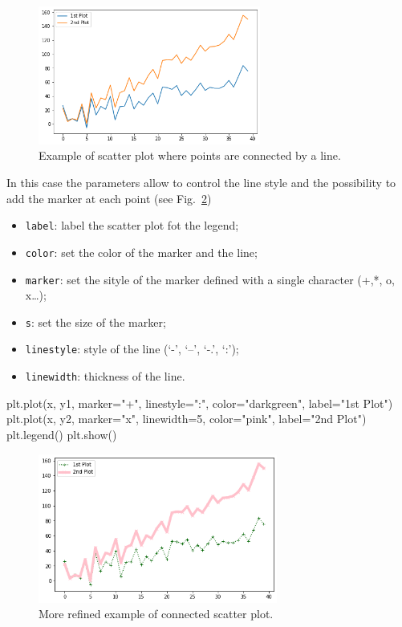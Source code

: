 \begin{figure}[htb]
	\centering
	\includegraphics[width=0.65\textwidth]{figures/plot1}
	\caption{Example of scatter plot where points are connected by a line.}
	\label{fig:plot1}
\end{figure}

In this case the parameters allow to control the line style and the possibility to add the marker at each point (see Fig.~\ref{fig:plot2})

\begin{itemize}
\tightlist
\item \texttt{label}: label the scatter plot fot the legend;
\item \texttt{color}: set the color of the marker and the line;
\item \texttt{marker}: set the sityle of the marker defined with a single character (+,*, o, x\ldots{});
\item \texttt{s}: set the size of the marker;
\item \texttt{linestyle}: style of the line (`-', `--', `-.', `:');
\item \texttt{linewidth}: thickness of the line.
\end{itemize}

\begin{ipythonnon}
plt.plot(x, y1, marker="+", linestyle=":", color="darkgreen", label="1st Plot")
plt.plot(x, y2, marker="x", linewidth=5, color="pink", label="2nd Plot")
plt.legend()
plt.show()
\end{ipythonnon}

\begin{figure}[htb]
	\centering
	\includegraphics[width=0.7\textwidth]{figures/plot2}
	\caption{More refined example of connected scatter plot.}
	\label{fig:plot2}
\end{figure}

